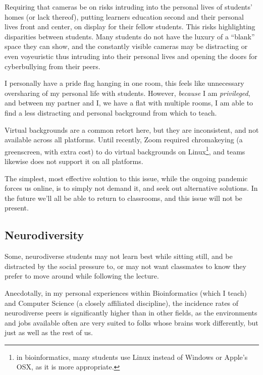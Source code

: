 \documentclass[paper=a4,justified,a4paper]{tufte-handout}
\begin{document}
Requiring that cameras be on risks intruding into the personal lives of
students' homes (or lack thereof), putting learners education second and
their personal lives front and center, on display for their fellow
students. This risks highlighting disparities between students. Many
students do not have the luxury of a ``blank'' space they can show, and
the constantly visible cameras may be distracting or even voyeuristic
\citep{reed_2020, ng2020communicative} thus intruding into their
personal lives and opening the doors for cyberbullying from their peers.

I personally have a pride flag hanging in one room, this feels like
unnecessary oversharing of my personal life with students. However,
\emph{because} I am \emph{privileged}, and between my partner and I, we
have a flat with multiple rooms, I am able to find a less distracting
and personal background from which to teach.

Virtual backgrounds are a common retort here, but they are inconsistent,
and not available across all platforms. Until recently, Zoom required
chromakeying (a greenscreen, with extra cost) to do virtual backgrounds
on
Linux\footnote{in bioinformatics, many students use Linux instead of Windows or Apple's OSX, as it is more appropriate.},
and teams likewise does not support it on all platforms.

The simplest, most effective solution to this issue, while the ongoing
pandemic forces us online, is to simply not demand it, and seek out
alternative solutions. In the future we'll all be able to return to
classrooms, and this issue will not be present.

\hypertarget{neurodiversity}{%
\subsection{Neurodiversity}\label{neurodiversity}}

Some, neurodiverse students may not learn best while sitting still, and
be distracted by the social pressure to, or may not want classmates to
know they prefer to move around while following the
lecture\citep{duncan2021}.

Anecdotally, in my personal experiences within Bioinformatics (which I
teach) and Computer Science (a closely affiliated discipline), the
incidence rates of neurodiverse peers is significantly higher than in
other fields, as the environments and jobs available often are very
suited to folks whose brains work differently, but just as well as the
rest of us.
\end{document}

